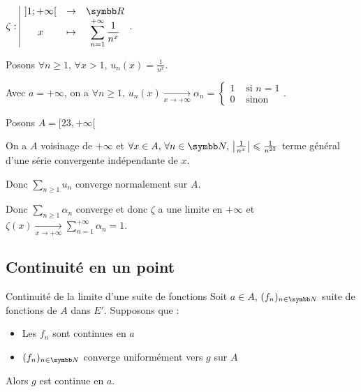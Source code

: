 \begin{exemple}
    $\fonction \zeta{]1; +\infty[}{\R}{x}{\sum_{n = 1}^{+ \infty} \frac 1 {n^x}}$.

    Posons $\forall n \geqslant 1, \, \forall x > 1, \, u_n(x) = \frac 1 {n^x}$.

    Avec $a = + \infty$, on a $\forall n \geqslant 1, \, u_n(x) \xrightarrow[x \to +\infty]{} \alpha_n = \left\{\begin{array}{cc} 1 & \text{ si } n = 1 \\ 0 & \text{ sinon } \end{array} \right.$.
        
    Posons $A = [23, + \infty[$

    On a $A$ voisinage de $+ \infty$ et $\forall x \in A, \, \forall n \in \N, \, \left| \frac{1}{n^x} \right| \leqslant \frac 1 {n^{23}}$ 
    terme général d'une série convergente indépendante de $x$.

    Donc $\displaystyle \sum_{n \geqslant 1} u_n$ converge normalement sur $A$. 

    Donc $\displaystyle \sum_{n \geqslant 1} \alpha_n$ converge et donc $\zeta$ a une limite en $+ \infty$ et 
    $\zeta(x) \xrightarrow[x \to +\infty]{} \sum_{n = 1 }^{+ \infty } \alpha_n = 1$.

\end{exemple}

\subsection{Continuité en un point }

\begin{proposition}{Continuité de la limite d'une suite de fonctions}{}
    Soit $a \in A$, $(f_n)_{n \in \N}$ suite de fonctions de $A$ dans $E'$. Supposons que : 
    \begin{itemize}
        \item Les $f_n$ sont continues en $a$
        \item $(f_n)_{n \in \N}$ converge uniformément vers $g$ sur $A$
    \end{itemize}
    Alors $g$ est continue en $a$.
\end{proposition}


